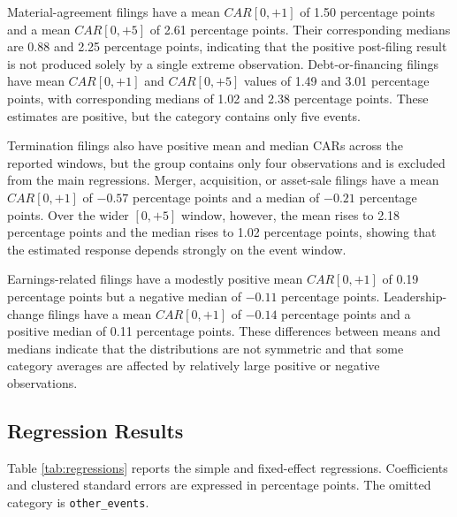 \documentclass[12pt]{article}
\begin{document}
Material-agreement filings have a mean $CAR[0,+1]$ of 1.50 percentage points and a mean $CAR[0,+5]$ of 2.61 percentage points. Their corresponding medians are 0.88 and 2.25 percentage points, indicating that the positive post-filing result is not produced solely by a single extreme observation. Debt-or-financing filings have mean $CAR[0,+1]$ and $CAR[0,+5]$ values of 1.49 and 3.01 percentage points, with corresponding medians of 1.02 and 2.38 percentage points. These estimates are positive, but the category contains only five events.

Termination filings also have positive mean and median CARs across the reported windows, but the group contains only four observations and is excluded from the main regressions. Merger, acquisition, or asset-sale filings have a mean $CAR[0,+1]$ of $-0.57$ percentage points and a median of $-0.21$ percentage points. Over the wider $[0,+5]$ window, however, the mean rises to 2.18 percentage points and the median rises to 1.02 percentage points, showing that the estimated response depends strongly on the event window.

Earnings-related filings have a modestly positive mean $CAR[0,+1]$ of 0.19 percentage points but a negative median of $-0.11$ percentage points. Leadership-change filings have a mean $CAR[0,+1]$ of $-0.14$ percentage points and a positive median of 0.11 percentage points. These differences between means and medians indicate that the distributions are not symmetric and that some category averages are affected by relatively large positive or negative observations.

\subsection{Regression Results}

Table \ref{tab:regressions} reports the simple and fixed-effect regressions. Coefficients and clustered standard errors are expressed in percentage points. The omitted category is \texttt{other\_events}.
\end{document}
